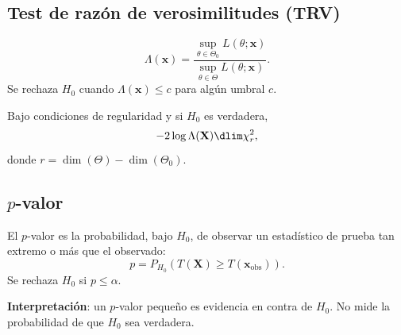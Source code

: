 \subsection{Test de razón de verosimilitudes (TRV)}

\begin{defi}
  \[
    \Lambda(\mathbf{x}) =
    \frac{\sup_{\theta \in \Theta_0} L(\theta;\mathbf{x})}
         {\sup_{\theta \in \Theta} L(\theta;\mathbf{x})}.
  \]
  Se rechaza $H_0$ cuando $\Lambda(\mathbf{x}) \leq c$ para algún umbral $c$.
\end{defi}

\begin{teo}[Wilks]
  Bajo condiciones de regularidad y si $H_0$ es verdadera,
  \[
    -2\log\Lambda(\mathbf{X}) \dlim \chi^2_r,
  \]
  donde $r = \dim(\Theta) - \dim(\Theta_0)$.
\end{teo}

\subsection{\texorpdfstring{$p$}{p}-valor}

\begin{defi}[$p$-valor]
  El $p$-valor es la probabilidad, bajo $H_0$, de observar un estadístico de
  prueba tan extremo o más que el observado:
  \[
    p = P_{H_0}(T(\mathbf{X}) \geq T(\mathbf{x}_{\text{obs}})).
  \]
  Se rechaza $H_0$ si $p \leq \alpha$.
\end{defi}

\begin{resultado}
  \textbf{Interpretación}: un $p$-valor pequeño es evidencia en contra de
  $H_0$. No mide la probabilidad de que $H_0$ sea verdadera.
\end{resultado}
